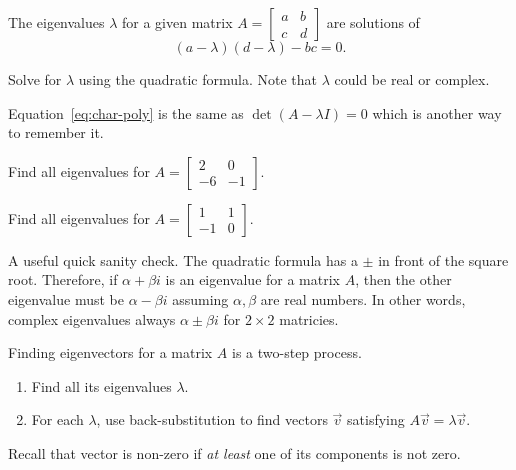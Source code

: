\documentclass[../main.tex]{subfiles}
\begin{document}
\begin{method} \label{method:eigenvalues}
  The eigenvalues \(\lambda\) for a given matrix \(A = \begin{bmatrix}a & b \\ c & d \end{bmatrix}\) are solutions of
  \begin{equation} \label{eq:char-poly}
    (a - \lambda)(d - \lambda) - bc = 0.
  \end{equation}

  Solve for \(\lambda\) using the quadratic formula. Note that \(\lambda\) could be real or complex.
\end{method}
Equation~\eqref{eq:char-poly} is the same as \(\det(A - \lambda I) = 0\) which is another way to remember it.

\begin{example} \label{ex:eigenvalues-real}
  Find all eigenvalues for \(A = \begin{bmatrix} 2 & 0 \\ -6 & -1 \end{bmatrix}\).
\end{example}

\begin{example} \label{ex:eigenvalues-complex}
  Find all eigenvalues for \(A = \begin{bmatrix} 1 & 1 \\ -1 & 0 \end{bmatrix}\).
\end{example}

{\footnotesize \faExclamationTriangle{} A useful quick sanity check. The quadratic formula has a \(\pm\) in front of the square root. Therefore, if \(\alpha + \beta i\) is an eigenvalue for a matrix \(A\), then the other eigenvalue must be \(\alpha - \beta i\) assuming \(\alpha,\beta\) are real numbers.  In other words, complex eigenvalues always  \(\alpha \pm \beta i\) for \(2 \times 2\) matricies.}
\clearpage

\begin{method} \label{method:eigenvectors}
  Finding eigenvectors for a matrix \(A\) is a two-step process.
  \begin{enumerate}
    \item Find all its eigenvalues \(\lambda\). 
    \item For each \(\lambda\), use back-substitution to find  vectors \(\vec{v}\) satisfying \(A \vec{v} = \lambda \vec{v}\). 
  \end{enumerate}

  Recall that vector is non-zero if \emph{at least} one of its components is not zero.
\end{method}
\end{document}
